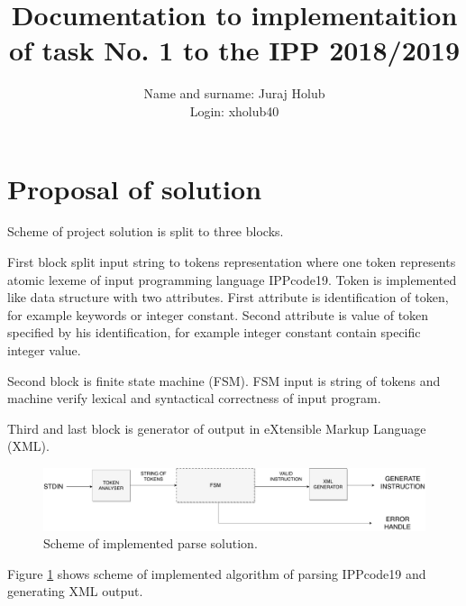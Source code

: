 \documentclass[a4paper, 10pt]{article}
\title{Documentation to implementaition of task No. 1 to the IPP 2018/2019 }
\author{Name and surname: Juraj Holub\\ Login: xholub40}
\date{}
\begin{document}
	\maketitle
	\thispagestyle{empty}

\section{Proposal of solution} \label{proposal}
Scheme of project solution is split to three blocks. 

First block split input string to tokens representation where one token represents atomic lexeme of input programming language IPPcode19. Token is implemented like data structure with two attributes. First attribute is identification of token, for example keywords or integer constant. Second attribute is value of token specified by his identification, for example integer constant contain specific integer value.

Second block is finite state machine (FSM). FSM input is string of tokens and machine verify lexical and syntactical correctness of input program.

Third and last block is generator of output in eXtensible Markup Language (XML). 

\begin{figure}[H] 
	\centering
	\includegraphics[width=.8 \paperwidth]{ipp_parse}
	\caption{Scheme of implemented parse solution.}
	\label{obr1}
\end{figure} 

Figure \ref{obr1} shows scheme of implemented algorithm of parsing IPPcode19 and generating XML output.
\end{document}

